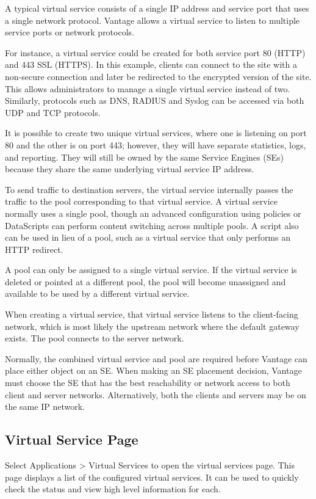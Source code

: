 \documentclass[letterpaper,10pt,english]{sphinxmanual}
\let\sphinxpxdimen\pdfpxdimen\else\newdimen\sphinxpxdimen
\begin{document}
\noindent\sphinxincludegraphics[width=573\sphinxpxdimen]{{architecture_1}.jpg}

A typical virtual service consists of a single IP address and service port that uses a single network protocol. Vantage allows a virtual service to listen to multiple service ports or network protocols.

For instance, a virtual service could be created for both service port 80 (HTTP) and 443 SSL (HTTPS). In this example, clients can connect to the site with a non-secure connection and later be redirected to the encrypted version of the site. This allows administrators to manage a single virtual service instead of two. Similarly, protocols such as DNS, RADIUS and Syslog can be accessed via both UDP and TCP protocols.

It is possible to create two unique virtual services, where one is listening on port 80 and the other is on port 443; however, they will have separate statistics, logs, and reporting. They will still be owned by the same Service Engines (SEs) because they share the same underlying virtual service IP address.

To send traffic to destination servers, the virtual service internally passes the traffic to the pool corresponding to that virtual service. A virtual service normally uses a single pool, though an advanced configuration using policies or DataScripts can perform content switching across multiple pools. A script also can be used in lieu of a pool, such as a virtual service that only performs an HTTP redirect.

A pool can only be assigned to a single virtual service. If the virtual service is deleted or pointed at a different pool, the pool will become unassigned and available to be used by a different virtual service.

When creating a virtual service, that virtual service listens to the client-facing network, which is most likely the upstream network where the default gateway exists. The pool connects to the server network.

Normally, the combined virtual service and pool are required before Vantage can place either object on an SE. When making an SE placement decision, Vantage must choose the SE that has the best reachability or network access to both client and server networks. Alternatively, both the clients and servers may be on the same IP network.


\subsection{Virtual Service Page}
\label{\detokenize{getting_started/virtual_services:virtual-service-page}}
Select Applications \textgreater{} Virtual Services to open the virtual services
page. This page displays a list of the configured virtual services. It
can be used to quickly check the status and view high level information
for each.
\end{document}
